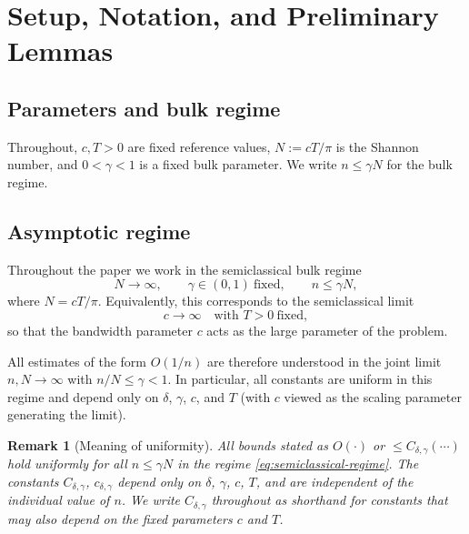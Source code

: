 \documentclass[12pt,a4paper]{amsart}
\newtheorem{remark}[theorem]{Remark}
\begin{document}
\section{Setup, Notation, and Preliminary Lemmas}\label{sec:setup}

\subsection{Parameters and bulk regime}

Throughout, $c, T > 0$ are fixed reference values,
$N := cT/\pi$ is the Shannon number, and
$0 < \gamma < 1$ is a fixed bulk parameter.
We write $n \le \gamma N$ for the bulk regime.

\subsection{Asymptotic regime}\label{subsec:regime}

Throughout the paper we work in the semiclassical bulk regime
\begin{equation}\label{eq:semiclassical-regime}
  N \to \infty,
  \qquad \gamma \in (0,1)\ \text{fixed},
  \qquad n \le \gamma N,
\end{equation}
where $N = cT/\pi$.
Equivalently, this corresponds to the semiclassical limit
\[
  c \to \infty \quad \text{with } T > 0\ \text{fixed},
\]
so that the bandwidth parameter $c$ acts as the large parameter
of the problem.

All estimates of the form $O(1/n)$ are therefore understood
in the joint limit $n, N \to \infty$ with $n/N \le \gamma < 1$.
In particular, all constants are uniform in this regime and
depend only on $\delta$, $\gamma$, $c$, and $T$
(with $c$ viewed as the scaling parameter generating the limit).

\begin{remark}[Meaning of uniformity]\label{rem:uniformity}
All bounds stated as $O(\cdot)$ or $\le C_{\delta,\gamma}(\cdots)$
hold \emph{uniformly for all $n \le \gamma N$} in the regime
\eqref{eq:semiclassical-regime}.
The constants $C_{\delta,\gamma}$, $c_{\delta,\gamma}$
depend only on $\delta$, $\gamma$, $c$, $T$, and are independent
of the individual value of $n$.
We write $C_{\delta,\gamma}$ throughout as shorthand
for constants that may also depend on the fixed parameters
$c$ and $T$.
\end{remark}
\end{document}
